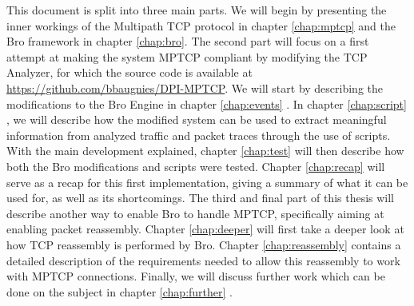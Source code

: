 This document is split into three main parts. We will begin by presenting the inner workings of the Multipath TCP protocol in chapter \ref{chap:mptcp} and the Bro framework in chapter \ref{chap:bro}. The second part will focus on a first attempt at making the system MPTCP compliant by modifying the TCP Analyzer, for which the source code is available at \url{https://github.com/bbaugnies/DPI-MPTCP}. We will start by describing the modifications to the Bro Engine in chapter \ref{chap:events} . In chapter \ref{chap:script} , we will describe how the modified system can be used to extract meaningful information from analyzed traffic and packet traces through the use of scripts. With the main development explained, chapter \ref{chap:test} will then describe how both the Bro modifications and scripts were tested. Chapter \ref{chap:recap} will serve as a recap for this first implementation, giving a summary of what it can be used for, as well as its shortcomings. The third and final part of this thesis will describe another way to enable Bro to handle MPTCP, specifically aiming at enabling packet reassembly. Chapter \ref{chap:deeper} will first take a deeper look at how TCP reassembly is performed by Bro. Chapter \ref{chap:reassembly} contains a detailed description of the requirements needed to allow this reassembly to work with MPTCP connections. Finally, we will discuss further work which can be done on the subject in chapter \ref{chap:further} .